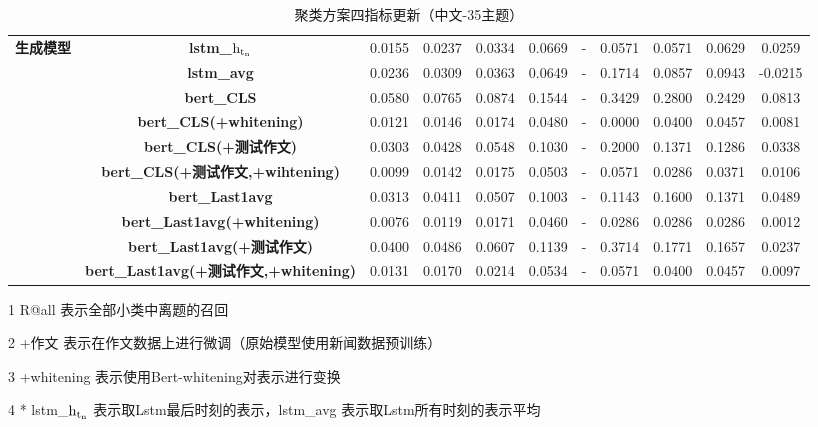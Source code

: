 \documentclass[11pt]{article}
\begin{document}
\begin{CJK}{UTF8}{gkai}
\begin{table}[htbp]
{\begin{tabular}{c|c|ccccccccc}
      \multirow{10}[0]{*}{\textbf{生成模型}} & \textbf{lstm\_$\rm h_{t_n}$} & 0.0155  & 0.0237  & 0.0334  & 0.0669  & -     & 0.0571  & 0.0571  & 0.0629  & 0.0259  \\
      & \textbf{lstm\_avg} & 0.0236  & 0.0309  & 0.0363  & 0.0649  & -     & 0.1714  & 0.0857  & 0.0943  & -0.0215  \\
      \cline{2-11}
      & \textbf{bert\_CLS} & 0.0580  & 0.0765  & 0.0874  & 0.1544  & -     & 0.3429  & 0.2800  & 0.2429  & 0.0813  \\
      & \textbf{bert\_CLS(+whitening)} & 0.0121  & 0.0146  & 0.0174  & 0.0480  & -     & 0.0000  & 0.0400  & 0.0457  & 0.0081  \\
      & \textbf{bert\_CLS(+测试作文)} & 0.0303  & 0.0428  & 0.0548  & 0.1030  & -     & 0.2000  & 0.1371  & 0.1286  & 0.0338  \\
      & \textbf{bert\_CLS(+测试作文,+wihtening)} & 0.0099  & 0.0142  & 0.0175  & 0.0503  & -     & 0.0571  & 0.0286  & 0.0371  & 0.0106  \\
      \cline{2-11}
      & \textbf{bert\_Last1avg} & 0.0313  & 0.0411  & 0.0507  & 0.1003  & -     & 0.1143  & 0.1600  & 0.1371  & 0.0489  \\
      & \textbf{bert\_Last1avg(+whitening)} & 0.0076  & 0.0119  & 0.0171  & 0.0460  & -     & 0.0286  & 0.0286  & 0.0286  & 0.0012  \\
      & \textbf{bert\_Last1avg(+测试作文)} & 0.0400  & 0.0486  & 0.0607  & 0.1139  & -     & 0.3714  & 0.1771  & 0.1657  & 0.0237  \\
      & \textbf{bert\_Last1avg(+测试作文,+whitening)} & 0.0131  & 0.0170  & 0.0214  & 0.0534  & -     & 0.0571  & 0.0400  & 0.0457  & 0.0097  \\
      \hline
    \end{tabular}}%
    \begin{tablenotes}    %
      \footnotesize               %
      \item[1] R@all 表示全部小类中离题的召回
      \item[2] +作文 表示在作文数据上进行微调（原始模型使用新闻数据预训练） 
      \item[3] +whitening 表示使用Bert-whitening对表示进行变换
      \item[4] * lstm\_$\rm h_{t_n}$ 表示取Lstm最后时刻的表示，lstm\_avg 表示取Lstm所有时刻的表示平均
    \end{tablenotes} 
    \caption{聚类方案四指标更新（中文-35主题）}
  \label{tab:addlabel}%
\end{table}%

\end{CJK}
\end{document}
